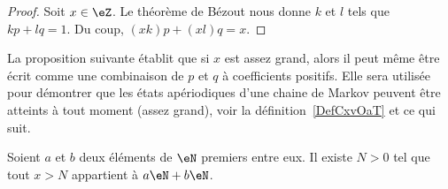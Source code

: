 \begin{proof}
    Soit \( x\in \eZ\). Le théorème de Bézout nous donne \( k\) et \( l\) tels que \( kp+lq=1\). Du coup, \( (xk)p+(xl)q=x\).
\end{proof}



La proposition suivante établit que si \( x\) est assez grand, alors il peut même être écrit comme une combinaison de \( p\) et \( q\) à coefficients positifs. Elle sera utilisée pour démontrer que les états apériodiques d'une chaine de Markov peuvent être atteints à tout moment (assez grand), voir la définition~\ref{DefCxvOaT} et ce qui suit.

\begin{proposition}     \label{PropLAbRSE}
    Soient \( a\) et \( b\) deux éléments de \( \eN\) premiers entre eux. Il existe \( N>0\) tel que tout \( x>N\) appartient à \( a\eN+b\eN\).
\end{proposition}

